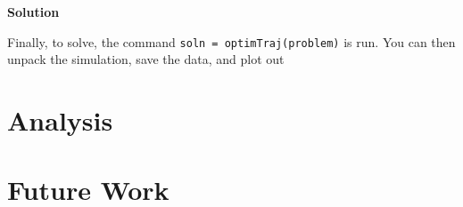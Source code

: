 \documentclass[12pt]{article}
\begin{document}
\begin{flushleft}
{\Large \textbf{\textbf{Solution}} }
\end{flushleft}
Finally, to solve, the command \lstinline!soln = optimTraj(problem)! is run. You can then unpack the simulation, save the data, and plot out
\section{Analysis}
\section{Future Work}



\end{document}
